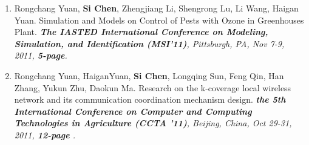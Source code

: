 \documentclass[letter]{article}
\newcommand{\publication}[4]{\item #1. #2. \emph{#3.} #4}
\begin{document}
\begin{description}
\begin{enumerate}[{C-}1.]
\publication{Rongchang Yuan, \textbf{Si Chen}, Zhengjiang Li, Shengrong Lu, Li Wang, Haigan Yuan} {Simulation and Models on Control of Pests with Ozone in Greenhouses Plant}  {\textbf{The IASTED International Conference on Modeling, Simulation, and Identification (MSI'11)}, Pittsburgh, PA, Nov 7-9, 2011, \textbf{5-page}} 

\publication{Rongchang Yuan, HaiganYuan, \textbf{Si Chen}, Longqing Sun, Feng Qin, Han Zhang, Yukun Zhu, Daokun Ma} {Research on the k-coverage local wireless network and its communication coordination mechanism design}  {\textbf{the 5th International Conference on Computer and Computing Technologies in Agriculture (CCTA '11)}, Beijing, China, Oct 29-31, 2011, \textbf{12-page }} 







\end{enumerate}
\end{description}
\end{document}
